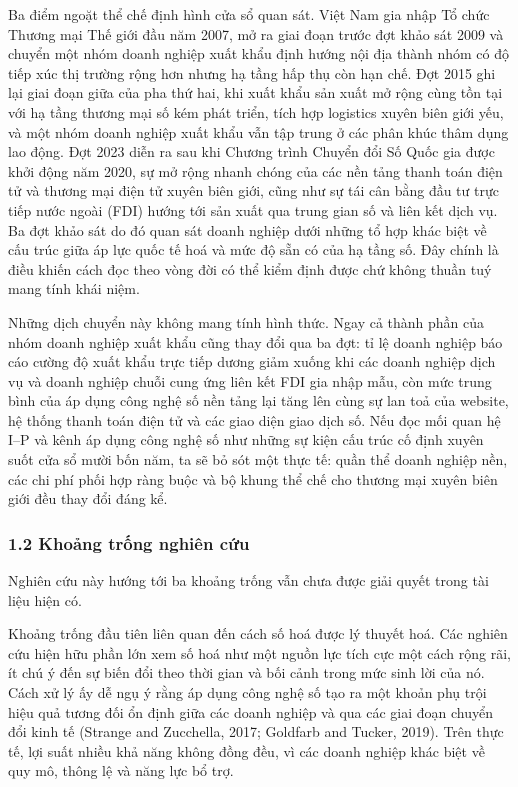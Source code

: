 \documentclass[12pt,a4paper]{article}
\begin{document}
Ba điểm ngoặt thể chế định hình cửa sổ quan sát. Việt Nam gia nhập Tổ
chức Thương mại Thế giới đầu năm 2007, mở ra giai đoạn trước đợt khảo
sát 2009 và chuyển một nhóm doanh nghiệp xuất khẩu định hướng nội địa
thành nhóm có độ tiếp xúc thị trường rộng hơn nhưng hạ tầng hấp thụ còn
hạn chế. Đợt 2015 ghi lại giai đoạn giữa của pha thứ hai, khi xuất khẩu
sản xuất mở rộng cùng tồn tại với hạ tầng thương mại số kém phát triển,
tích hợp logistics xuyên biên giới yếu, và một nhóm doanh nghiệp xuất
khẩu vẫn tập trung ở các phân khúc thâm dụng lao động. Đợt 2023 diễn ra
sau khi Chương trình Chuyển đổi Số Quốc gia được khởi động năm 2020, sự
mở rộng nhanh chóng của các nền tảng thanh toán điện tử và thương mại
điện tử xuyên biên giới, cũng như sự tái cân bằng đầu tư trực tiếp nước
ngoài (FDI) hướng tới sản xuất qua trung gian số và liên kết dịch vụ. Ba
đợt khảo sát do đó quan sát doanh nghiệp dưới những tổ hợp khác biệt về
cấu trúc giữa áp lực quốc tế hoá và mức độ sẵn có của hạ tầng số. Đây
chính là điều khiến cách đọc theo vòng đời có thể kiểm định được chứ
không thuần tuý mang tính khái niệm.

Những dịch chuyển này không mang tính hình thức. Ngay cả thành phần của
nhóm doanh nghiệp xuất khẩu cũng thay đổi qua ba đợt: tỉ lệ doanh nghiệp
báo cáo cường độ xuất khẩu trực tiếp dương giảm xuống khi các doanh
nghiệp dịch vụ và doanh nghiệp chuỗi cung ứng liên kết FDI gia nhập mẫu,
còn mức trung bình của áp dụng công nghệ số nền tảng lại tăng lên cùng
sự lan toả của website, hệ thống thanh toán điện tử và các giao diện
giao dịch số. Nếu đọc mối quan hệ I--P và kênh áp dụng công nghệ số như
những sự kiện cấu trúc cố định xuyên suốt cửa sổ mười bốn năm, ta sẽ bỏ
sót một thực tế: quần thể doanh nghiệp nền, các chi phí phối hợp ràng
buộc và bộ khung thể chế cho thương mại xuyên biên giới đều thay đổi
đáng kể.

\hypertarget{12-khoux1ea3ng-trux1ed1ng-nghiuxean-cux1ee9u}{%
\subsubsection{1.2 Khoảng trống nghiên
cứu}\label{12-khoux1ea3ng-trux1ed1ng-nghiuxean-cux1ee9u}}

Nghiên cứu này hướng tới ba khoảng trống vẫn chưa được giải quyết trong
tài liệu hiện có.

Khoảng trống đầu tiên liên quan đến cách số hoá được lý thuyết hoá. Các
nghiên cứu hiện hữu phần lớn xem số hoá như một nguồn lực tích cực một
cách rộng rãi, ít chú ý đến sự biến đổi theo thời gian và bối cảnh trong
mức sinh lời của nó. Cách xử lý ấy dễ ngụ ý rằng áp dụng công nghệ số
tạo ra một khoản phụ trội hiệu quả tương đối ổn định giữa các doanh
nghiệp và qua các giai đoạn chuyển đổi kinh tế (Strange and Zucchella,
2017; Goldfarb and Tucker, 2019). Trên thực tế, lợi suất nhiều khả năng
không đồng đều, vì các doanh nghiệp khác biệt về quy mô, thông lệ và
năng lực bổ trợ.
\end{document}
